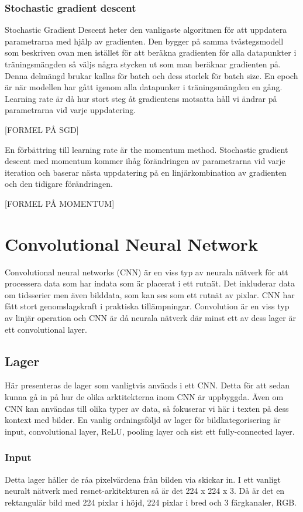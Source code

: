 \documentclass[]{kththesis}
\begin{document}
\subsubsection{Stochastic gradient descent}
Stochastic Gradient Descent heter den vanligaste algoritmen för att uppdatera parametrarna med hjälp av gradienten. Den bygger på samma tvåstegsmodell som beskriven ovan men istället för att beräkna gradienten för alla datapunkter i träningsmängden så väljs några stycken ut som man beräknar gradienten på. Denna delmängd brukar kallas för batch och dess storlek för batch size. En epoch är när modellen har gått igenom alla datapunker i träningsmängden en gång. Learning rate är då hur stort steg åt gradientens motsatta håll vi ändrar på parametrarna vid varje uppdatering.

[FORMEL PÅ SGD]

En förbättring till learning rate är the momentum method. Stochastic gradient descent med momentum kommer ihåg förändringen av parametrarna vid varje iteration och baserar nästa uppdatering på en linjärkombination av gradienten och den tidigare förändringen. 

[FORMEL PÅ MOMENTUM]

\section{Convolutional Neural Network}
Convolutional neural networks (CNN) är en viss typ av neurala nätverk för att processera data som har indata som är placerat i ett rutnät. Det inkluderar data om tidsserier men även bilddata, som kan ses som ett rutnät av pixlar. CNN har fått stort genomslagskraft i praktiska tillämpningar. Convolution är en viss typ av linjär operation och CNN är då neurala nätverk där minst ett av dess lager är ett convolutional layer.

\subsection{Lager}
Här presenteras de lager som vanligtvis används i ett CNN. Detta för att sedan kunna gå in på hur de olika arktitekterna inom CNN är uppbyggda. Även om CNN kan användas till olika typer av data, så fokuserar vi här i texten på dess kontext med bilder. En vanlig ordningsföljd av lager för bildkategorisering är input, convolutional layer, ReLU, pooling layer och sist ett fully-connected layer.

\subsubsection{Input}
Detta lager håller de råa pixelvärdena från bilden via skickar in. I ett vanligt neuralt nätverk med resnet-arkitekturen så är det 224 x 224 x 3. Då är det en rektangulär bild med 224 pixlar i höjd, 224 pixlar i bred och 3 färgkanaler, RGB.
\end{document}
